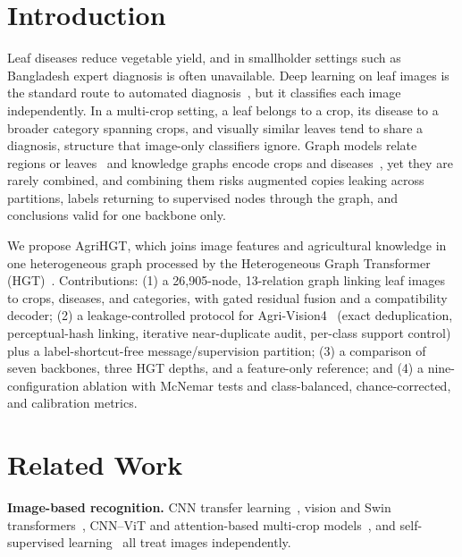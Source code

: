 \documentclass[conference]{IEEEtran}
\begin{document}
\section{Introduction}
Leaf diseases reduce vegetable yield, and in smallholder settings such as Bangladesh expert diagnosis is often unavailable. Deep learning on leaf images is the standard route to automated diagnosis~\cite{ferentinos2018deep,srivastava2021plant}, but it classifies each image independently. In a multi-crop setting, a leaf belongs to a crop, its disease to a broader category spanning crops, and visually similar leaves tend to share a diagnosis, structure that image-only classifiers ignore. Graph models relate regions or leaves~\cite{bera2024pndnet,surekha2026adjleafgnn} and knowledge graphs encode crops and diseases~\cite{zhao2024llmkg,yan2025cropdpkg,li2025marbc}, yet they are rarely combined, and combining them risks augmented copies leaking across partitions, labels returning to supervised nodes through the graph, and conclusions valid for one backbone only.

We propose AgriHGT, which joins image features and agricultural knowledge in one heterogeneous graph processed by the Heterogeneous Graph Transformer (HGT)~\cite{hu2020heterogeneous}. Contributions: (1) a 26,905-node, 13-relation graph linking leaf images to crops, diseases, and categories, with gated residual fusion and a compatibility decoder; (2) a leakage-controlled protocol for Agri-Vision4~\cite{billah2026agrivision4} (exact deduplication, perceptual-hash linking, iterative near-duplicate audit, per-class support control) plus a label-shortcut-free message/supervision partition; (3) a comparison of seven backbones, three HGT depths, and a feature-only reference; and (4) a nine-configuration ablation with McNemar tests and class-balanced, chance-corrected, and calibration metrics.

\section{Related Work}
\textbf{Image-based recognition.} CNN transfer learning~\cite{ferentinos2018deep,srivastava2021plant,shahoveisi2023rust,shafik2024transfer,ali2025efficientnet}, vision and Swin transformers~\cite{boukabouya2022vision,murugavalli2025plant,liu2025plant}, CNN--ViT and attention-based multi-crop models~\cite{thakur2023vitcnn,subburaj2025plantention,hasan2026multicrop}, and self-supervised learning~\cite{wang2024ssl,zhao2023cla} all treat images independently.
\end{document}
